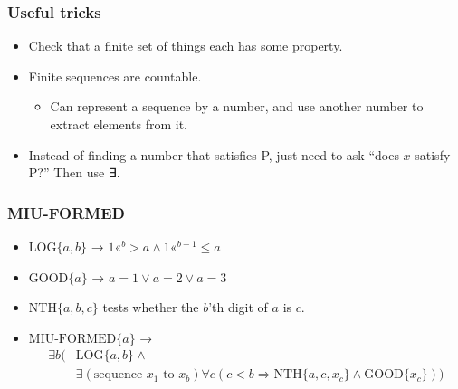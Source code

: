 \documentclass[mathserif]{beamer}
\newcommand{\shl}[1]{\text{«}^{#1}}
\begin{document}
\begin{frame}
\frametitle{Useful tricks}
\label{sec-4-2}

\pause
\begin{itemize}

\item Check that a finite set of things each has some property.\pause\\
\label{sec-4-2-1}%
\item Finite sequences are countable.\pause
\label{sec-4-2-2}%
\begin{itemize}

\item Can represent a sequence by a number, and use another number to extract elements from it.\pause\\
\label{sec-4-2-2-1}%
\end{itemize} %

\item Instead of finding a number that satisfies P, just need to ask ``does $x$ satisfy P?'' Then use ∃.\\
\label{sec-4-2-3}%
\end{itemize} %
\end{frame}
\begin{frame}
\frametitle{MIU-FORMED}
\label{sec-4-3}

\pause
\begin{itemize}

\item $\text{LOG}\{a,b\}$ → $1\shl{b} > a ∧ 1\shl{b-1} ≤ a$ \pause\\
\label{sec-4-3-1}%
\item $\text{GOOD}\{a\}$ → $a = 1 ∨ a = 2 ∨ a = 3$ \pause\\
\label{sec-4-3-2}%
\item $\text{NTH}\{a,b,c\}$ tests whether the $b$'th digit of $a$ is $c$.\pause\\
\label{sec-4-3-3}%
\item $\text{MIU-FORMED}\{a\}$ →\pause\\
\label{sec-4-3-4}%
\begin{align*}
∃b(&\text{LOG}\{a,b\} ∧\\
   &∃(\text{sequence }x_1\text{ to }x_b) ∀c (c < b ⇒ \text{NTH}\{a,c,x_c\} ∧ \text{GOOD}\{x_c\}))
\end{align*}
\end{itemize} %
\end{frame}
\end{document}
